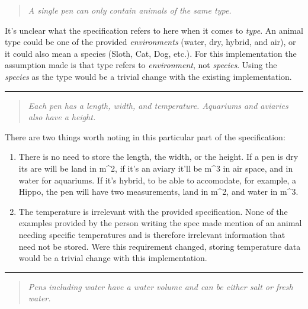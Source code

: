 \documentclass[english,a4paper,]{report}
\begin{document}
\begin{quote}
\emph{A single pen can only contain animals of the same type.}
\end{quote}

It's unclear what the specification refers to here when it comes to
\emph{type}. An animal type could be one of the provided
\emph{environments} (water, dry, hybrid, and air), or it could also mean
a species (Sloth, Cat, Dog, etc.). For this implementation the
assumption made is that type refers to \emph{environment}, not
\emph{species}. Using the \emph{species} as the type would be a trivial
change with the existing implementation.

\begin{center}\rule{0.5\linewidth}{\linethickness}\end{center}

\begin{quote}
\emph{Each pen has a length, width, and temperature. Aquariums and
aviaries also have a height.}
\end{quote}

There are two things worth noting in this particular part of the
specification:

\begin{enumerate}
\def\labelenumi{\arabic{enumi}.}
\item
  There is no need to store the length, the width, or the height. If a
  pen is dry its are will be land in m\^{}2, if it's an aviary it'll be
  m\^{}3 in air space, and in water for aquariums. If it's hybrid, to be
  able to accomodate, for example, a Hippo, the pen will have two
  measurements, land in m\^{}2, and water in m\^{}3.
\item
  The temperature is irrelevant with the provided specification. None of
  the examples provided by the person writing the spec made mention of
  an animal needing specific temperatures and is therefore irrelevant
  information that need not be stored. Were this requirement changed,
  storing temperature data would be a trivial change with this
  implementation.
\end{enumerate}

\begin{center}\rule{0.5\linewidth}{\linethickness}\end{center}

\begin{quote}
\emph{Pens including water have a water volume and can be either salt or
fresh water.}
\end{quote}
\end{document}
